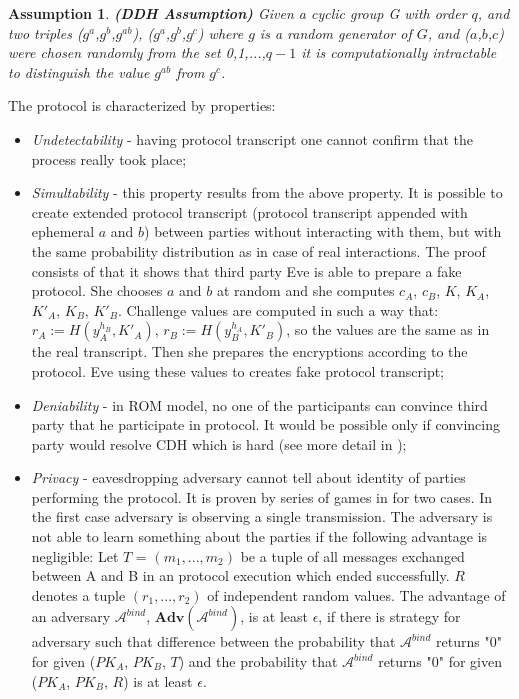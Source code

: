 \documentclass[11pt,titlepage]{article}
\theoremstyle{plain}
\newtheorem{assumption}{Assumption}
\begin{document}
\begin{assumption}
	\textbf{(DDH Assumption)} 
	Given a cyclic group G with order $q$, and two triples ($g^a$,$g^b$,$g^{ab}$), ($g^a$,$g^b$,$g^{c}$)  where $g$ 
	is a random generator of $G$, and ($a$,$b$,$c$) were chosen randomly from the set {0,1,...,$q-1$} it is computationally intractable to distinguish the value $g^{ab}$ from $g^{c}$.
\end{assumption}


The protocol is characterized by properties:
 \begin{itemize}
 	
 	\item \textit{Undetectability} - having protocol transcript one cannot confirm that the process really took place;
 	\item \textit{Simultability} - this property results from the above property. It is possible to create extended protocol transcript (protocol transcript appended with ephemeral $a$ and $b$) between parties without interacting with them, but with the same probability distribution as in case of real interactions. The proof consists of that it shows that third party Eve is able to prepare a fake protocol. She chooses $a$ and $b$ at random and she computes $c_A$, $c_B$, $K$, $K_A$, $K'_A$, $K_B$, $K'_B$. Challenge values are computed in such a way that: $r_A := H(y_A^{h_B},K'_A)$, $r_B := H(y_B^{h_A},K'_B)$, so the values are the same as in the real transcript. Then she prepares the encryptions according to the protocol. Eve using these values to creates fake protocol transcript;
 	\item \textit{Deniability} - in ROM model, no one of the participants can convince third party that he participate in protocol. It would be possible only if convincing party would resolve CDH which is hard (see more detail in \cite{AMA});
 	\item \textit{Privacy} - eavesdropping adversary cannot tell about identity of parties performing the protocol. It is proven by series of games in \cite{AMA} for two cases. In the first case adversary is observing a single transmission. The adversary is not able to learn something about the parties if the following advantage is negligible: Let $T$ = $(m_1,...,m_2)$ be a tuple of all messages exchanged between A and B in an protocol execution which ended successfully. $R$ denotes a tuple $(r_1,...,r_2)$ of independent random values. The advantage of an adversary $\mathcal{A}^{bind}$, $\textbf{Adv}(\mathcal{A}^{bind})$, is at least $\epsilon$, if there is strategy for adversary such that difference between the probability that $\mathcal{A}^{bind}$ returns "0" for given ($PK_A$, $PK_B$, $T$) and  the probability that $\mathcal{A}^{bind}$ returns "0" for given ($PK_A$, $PK_B$, $R$) is at least $\epsilon$.
 	

\end{itemize}
\end{document}
